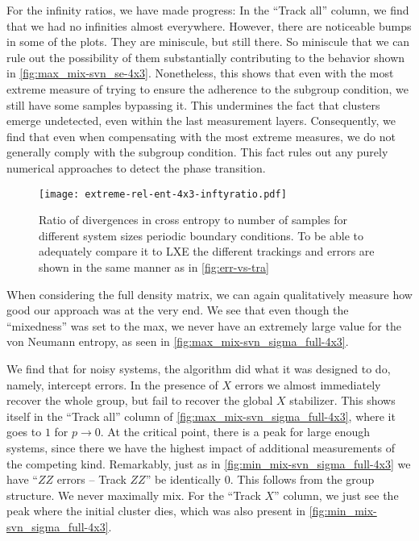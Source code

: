 For the infinity ratios, we have made progress: In the \enquote{Track all}
column, we find that we had no infinities almost everywhere.  However, there
are noticeable bumps in some of the plots. They are miniscule, but still there.
So miniscule that we can rule out the possibility of them substantially
contributing to the behavior shown in \cref{fig:max_mix-svn_se-4x3}.
Nonetheless, this shows that even with the most extreme measure of trying to
ensure the adherence to the subgroup condition, we still have some samples
bypassing it.  This undermines the fact that clusters emerge undetected, even
within the last measurement layers.  Consequently, we find that even when
compensating with the most extreme measures, we do not generally comply with
the subgroup condition.  This fact rules out any purely numerical approaches to
detect the phase transition.

\begin{figure}[p]
  \centering
  \texttt{[image: extreme-rel-ent-4x3-inftyratio.pdf]}
  \caption{Ratio of divergences in cross entropy to number of samples for
    different system sizes
  periodic boundary conditions. To be able to adequately compare it to LXE the
different trackings and errors are shown in the same manner as in
\cref{fig:err-vs-tra}}
  \label{fig:max_mix-inftyratio-4x3}
\end{figure}

When considering the full density matrix, we can again qualitatively measure
how good our approach was at the very end. We see that even though the
\enquote{mixedness} was set to the max, we never have an extremely large value
for the von Neumann entropy, as seen in \cref{fig:max_mix-svn_sigma_full-4x3}.

We find that for noisy systems, the algorithm did what it was designed to do,
namely, intercept errors. In the presence of $X$ errors we almost immediately
recover the whole group, but fail to recover the global $X$ stabilizer. This
shows itself in the \enquote{Track all} column of
\cref{fig:max_mix-svn_sigma_full-4x3}, where it goes to $1$ for $p\to 0$.  At
the critical point, there is a peak for large enough systems, since there we
have the highest impact of additional measurements of the competing kind.
Remarkably, just as in \cref{fig:min_mix-svn_sigma_full-4x3} we have
\enquote{$ZZ$ errors -- Track $ZZ$} be identically $0$. This follows from the
group structure. We never maximally mix. For the \enquote{Track $X$} column,
we just see the peak where the initial cluster dies, which was also present in
\cref{fig:min_mix-svn_sigma_full-4x3}.

